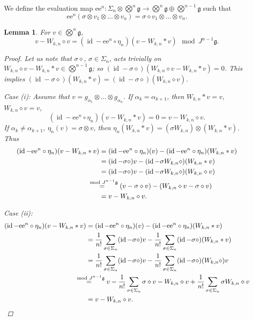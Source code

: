 \documentclass[11pt,a4paper]{amsart}
\newcommand{\plabel}[1]{ \label{#1}}
\newcommand{\snewpage}{}
\newcommand{\plabel}[1]{ \label{#1}\rlap{\smash{${}^{^{[#1]}}$}}}
\newcommand{\snewpage}{\newpage}
\newcommand{\plabel}[1]{ \label{#1}}
\newcommand{\snewpage}{}
\DeclareMathOperator{\id}{id}
\newcommand{\botimes}{{\textstyle\bigotimes}}
\theoremstyle{definition}
\theoremstyle{plain}
\newtheorem{lemma}[point]{Lemma}
\begin{document}
We define the evaluation map
$\mathrm e\mathrm e^{n}:\Sigma_n\otimes  \botimes^n\mathfrak g
\rightarrow \botimes^n\mathfrak g\oplus  \botimes^{n-1}\mathfrak g$
such that
\[\mathrm e\mathrm e^{n}(\sigma\otimes v_1\otimes\ldots\otimes v_n)=\sigma\diamond v_1\otimes\ldots\otimes v_n.\]
\snewpage
\begin{lemma}\plabel{lem:lazardkey} For $v\in\botimes^n\mathfrak g$,
\begin{equation}
v-W_{k,n}\diamond v=(\id- \mathrm e\mathrm e^{n}\circ\eta_n)(v-W_{k,n}*v) \mod J^{n-1}\mathfrak g.
\plabel{eq:lazardkey}
\end{equation}
\begin{proof}
Let us note that $\sigma\diamond$, $\sigma\in\Sigma_n$, acts trivially on $W_{k,n}\diamond v-W_{k,n}* v  \in\botimes^{n-1}\mathfrak g$; so
$(\id-\sigma\diamond)(W_{k,n}\diamond v-W_{k,n}* v)=0$. This implies   $(\id-\sigma\diamond)(W_{k,n}* v)=(\id-\sigma\diamond)(W_{k,n}\diamond v)$.

Case (i): Assume that $v=g_{\alpha_1}\otimes\ldots \otimes g_{\alpha_n}$.
If $\alpha_k=\alpha_{k+1}$, then $W_{k,n}*v=v$, $W_{k,n}\diamond v=v$,
\[(\id- \mathrm e\mathrm e^{n}\circ\eta_n)(v-W_{k,n}* v)=0=v-W_{k,n}\diamond v.\]
If $\alpha_k\neq\alpha_{k+1}$,  $\eta_n(v)=\sigma \otimes v$, then $\eta_n(W_{k,n}*v)=(\sigma W_{k,n} ) \otimes (W_{k,n}*v)$. Thus
\begin{align}\notag
(\id- \mathrm e\mathrm e^{n}\circ\eta_n)(v-W_{k,n}* v)&=(\id- \mathrm e\mathrm e^{n}\circ\eta_n)(v)-(\id- \mathrm e\mathrm e^{n}\circ\eta_n)(W_{k,n}* v)%
\\\notag&=
(\id-\sigma\diamond)v-(\id-\sigma W_{k,n}\diamond)(W_{k,n}*v)
\\\notag&=(\id-\sigma\diamond)v-(\id-\sigma W_{k,n}\diamond)(W_{k,n}\diamond v)%
\\\notag&\hspace{-7.7mm}
\stackrel{\mod J^{n-1}\mathfrak g }{=}(v-\sigma\diamond v)-( W_{k,n}\diamond v- \sigma\diamond v)
\\\notag&=v-W_{k,n}\diamond v.
\end{align}

Case (ii):
\begin{align}\notag
(\id- \mathrm e\mathrm e^{n}\circ\eta_n)(v-W_{k,n}* v)&=
(\id- \mathrm e\mathrm e^{n}\circ\eta_n)(v)-(\id- \mathrm e\mathrm e^{n}\circ\eta_n)(W_{k,n}* v)%
\\\notag&=
\frac1{n!}\sum_{\sigma\in\Sigma_n}(\id-\sigma\diamond)v-\frac1{n!}\sum_{\sigma\in\Sigma_n}(\id-\sigma\diamond)(W_{k,n}*v)%
\\\notag&=
\frac1{n!}\sum_{\sigma\in\Sigma_n}(\id-\sigma\diamond)v-\frac1{n!}\sum_{\sigma\in\Sigma_n}(\id-\sigma\diamond)(W_{k,n}\diamond)v
\\\notag&\hspace{-7.6mm}\stackrel{\mod J^{n-1}\mathfrak g}{=}
v-\frac1{n!}\sum_{\sigma\in\Sigma_n}\sigma\diamond v-W_{k,n}\diamond v+\frac1{n!}\sum_{\sigma\in\Sigma_n} \sigma W_{k,n}\diamond v
\\\notag&=v-W_{k,n}\diamond v.\qedhere
\end{align}
\end{proof}
\end{lemma}
\end{document}
